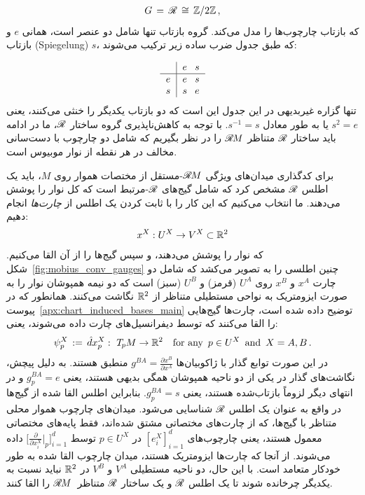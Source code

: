 \begin{align}
	G \,=\, \mathscr{R} \,\cong\, \mathbb{Z}/2\mathbb{Z} \,,
\end{align}
که بازتاب چارچوب‌ها را مدل می‌کند.
گروه بازتاب تنها شامل دو عنصر است، همانی $e$ و بازتاب (Spiegelung) $s$، که طبق جدول ضرب ساده زیر ترکیب می‌شوند:

\begin{align}\label{eq:reflection_multiplication_table}
	\begin{tabular}{c|c@{\hspace{8pt}}c}
		& $e$ & $s$ \\ \hline
		$e$ & $e$ & $s$ \\
		$s$ & $s$ & $e$
	\end{tabular}
\end{align}
تنها گزاره غیربدیهی در این جدول این است که دو بازتاب یکدیگر را خنثی می‌کنند، یعنی $s^2=e$ یا به طور معادل $s^{-1}=s$.
با توجه به کاهش‌ناپذیری گروه ساختار $\mathscr{R}$، ما در ادامه باید ساختار $\mathscr{R}$ متناظر $\mathscr{R}\mkern-1.8muM$ را در نظر بگیریم که شامل دو چارچوب با دست‌سانی مخالف در هر نقطه از نوار موبیوس است.


برای کدگذاری میدان‌های ویژگی $\mathscr{R}\mkern-1.8muM$-مستقل از مختصات هموار روی $M$، باید یک اطلس $\mathscr{R}$ مشخص کرد که شامل گیج‌های $\mathscr{R}$-مرتبط است که کل نوار را پوشش می‌دهند.
ما انتخاب می‌کنیم که این کار را با ثابت کردن یک اطلس از \emph{چارت‌ها} انجام دهیم:
\begin{align}
	x^X: U^X \to V^X \subset \mathbb{R}^2
\end{align}
که نوار را پوشش می‌دهند، و سپس گیج‌ها را از آن القا می‌کنیم.
شکل~\ref{fig:mobius_conv_gauges} چنین اطلسی را به تصویر می‌کشد که شامل دو چارت $x^A$ و $x^B$ روی $U^A$ (قرمز) و $U^B$ (سبز) است که دو نیمه همپوشان نوار را به صورت ایزومتریک به نواحی مستطیلی متناظر از $\mathbb{R}^2$ نگاشت می‌کنند.
همانطور که در پیوست~\ref{apx:chart_induced_bases_main} توضیح داده شده است، چارت‌ها گیج‌هایی را القا می‌کنند که توسط دیفرانسیل‌های چارت داده می‌شوند، یعنی:
\begin{align}
	\psi_p^X \,:=\, \hat{d}x^X_p :\ T_{\mkern-1.5mu p}\mkern-.5muM \to \mathbb{R}^2 \ \ \ \textup{for any}\,\ p\in U^X\,\ \text{and}\,\ X=A,B \,.
\end{align}
در این صورت توابع گذار با ژاکوبیان‌ها $g^{BA} = \frac{\partial x^B}{\partial x^A}$ منطبق هستند.
به دلیل پیچش، نگاشت‌های گذار در یکی از دو ناحیه همپوشان همگی بدیهی هستند، یعنی $g_p^{BA} = e$ و در انتهای دیگر لزوماً بازتاب‌شده هستند، یعنی $g_p^{BA} = s$.
بنابراین اطلس القا شده از گیج‌ها در واقع به عنوان یک اطلس $\mathscr{R}$ شناسایی می‌شود.
میدان‌های چارچوب هموار محلی متناظر با گیج‌ها، که از چارت‌های مختصاتی مشتق شده‌اند، فقط پایه‌های مختصاتی معمول هستند، یعنی چارچوب‌های $[e_i^X]_{i=1}^d$ در $p\in U^X$ توسط
$\bigl[\frac{\partial}{\partial x_i^X} \big|_p \bigr]_{i=1}^d$ داده می‌شوند.
از آنجا که چارت‌ها ایزومتریک هستند، میدان چارچوب القا شده به طور خودکار متعامد است.
با این حال، دو ناحیه مستطیلی $V^A$ و $V^B$ در $\mathbb{R}^2$ نباید نسبت به یکدیگر چرخانده شوند تا یک اطلس $\mathscr{R}$ و یک ساختار $\mathscr{R}$ متناظر~$\mathscr{R}\mkern-1.8muM$ را القا کنند.


